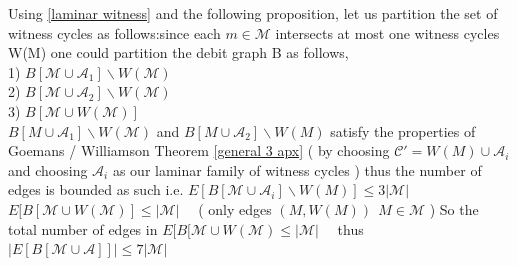 \documentclass[letterpaper,11pt]{article}
\newcommand{\0}{\mathbb{0}}
\newcommand{\1}{\mathbb{1}}
\begin{document}
Using \ref{laminar witness}  and the following proposition, let us partition the set of witness cycles as follows:since each $m \in \mathcal{M} $ intersects at most one witness cycles W(M) one could partition the debit graph B as follows, \\
1) $ B[\mathcal{M}  \cup \mathcal{A}_1 ] \backslash W(\mathcal{M} )$ \\
2) $ B[\mathcal{M}  \cup \mathcal{A}_2 ] \backslash W(\mathcal{M} ) $ \\
3) $B[\mathcal{M} \cup  W( \mathcal{M} ) ]  $  \\

$ B[M \cup \mathcal{A}_1 ] \backslash W( \mathcal{M} )$  and $ B[M \cup \mathcal{A}_2 ] \backslash W(M)$  satisfy the properties of Goemans / Williamson Theorem \ref{general 3 apx} ( by choosing $ \mathcal{C'}  = W(M) \cup \mathcal{A}_i $ and choosing $\mathcal{A}_i  $ as our laminar family of witness cycles ) thus the number of edges is bounded as such i.e. $ E[  B[ \mathcal{M} \cup \mathcal{A}_i ] \backslash W(M)]  \leq 3  | \mathcal{M}| $   \\
$  E [ B[ \mathcal{M} \cup  W( \mathcal{M} )  ]\leq | \mathcal{M}|    $  \ \ ( only edges $(M, W(M)  ) \ \ M \in \mathcal{M} $ ) So the total number of edges in $  E [ B[ \mathcal{M} \cup  W( \mathcal{M} ) \leq | \mathcal{M}|$ \ \ thus  $ |E [ B[ \mathcal{M} \cup  \mathcal{A} ] ]| \leq 7 | \mathcal{M}| $ 




\end{document}
